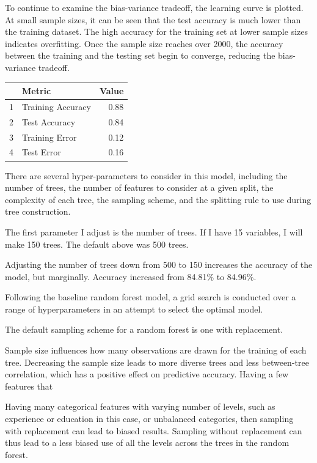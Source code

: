 \documentclass[11pt,preprint, authoryear]{elsarticle}
\let\origtable\table
\let\endorigtable\endtable
\renewenvironment{table}[1][2] {
    \expandafter\origtable\expandafter[H]
} {
    \endorigtable
}
\numberwithin{equation}{section}
\numberwithin{figure}{section}
\numberwithin{table}{section}
\begin{document}
To continue to examine the bias-variance tradeoff, the learning curve is
plotted. At small sample sizes, it can be seen that the test accuracy is
much lower than the training dataset. The high accuracy for the training
set at lower sample sizes indicates overfitting. Once the sample size
reaches over 2000, the accuracy between the training and the testing set
begin to converge, reducing the bias-variance tradeoff.

\begin{table}[H]
\centering
\begin{tabular}{rlr}
  \hline
 & Metric & Value \\ 
  \hline
1 & Training Accuracy & 0.88 \\ 
  2 & Test Accuracy & 0.84 \\ 
  3 & Training Error & 0.12 \\ 
  4 & Test Error & 0.16 \\ 
   \hline
\end{tabular}
\caption{More Metrics for Baseline Random Forest \label{tab1}} 
\end{table}

There are several hyper-parameters to consider in this model, including
the number of trees, the number of features to consider at a given
split, the complexity of each tree, the sampling scheme, and the
splitting rule to use during tree construction.

The first parameter I adjust is the number of trees. If I have 15
variables, I will make 150 trees. The default above was 500 trees.

Adjusting the number of trees down from 500 to 150 increases the
accuracy of the model, but marginally. Accuracy increased from 84.81\%
to 84.96\%.

Following the baseline random forest model, a grid search is conducted
over a range of hyperparameters in an attempt to select the optimal
model.

The default sampling scheme for a random forest is one with replacement.

Sample size influences how many observations are drawn for the training
of each tree. Decreasing the sample size leads to more diverse trees and
less between-tree correlation, which has a positive effect on predictive
accuracy. Having a few features that

Having many categorical features with varying number of levels, such as
experience or education in this case, or unbalanced categories, then
sampling with replacement can lead to biased results. Sampling without
replacement can thus lead to a less biased use of all the levels across
the trees in the random forest.
\end{document}
